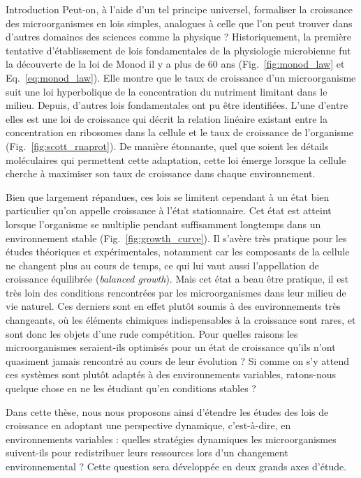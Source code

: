 \begin{chapter_summary}{Introduction}
Peut-on, à l'aide d'un tel principe universel, formaliser la croissance des microorganismes en lois simples, analogues à celle que l'on peut trouver dans d'autres domaines des sciences comme la physique ?
Historiquement, la première tentative d'établissement de lois fondamentales de la physiologie microbienne  fut la découverte de la loi de Monod il y a plus de 60 ans (Fig.~\ref{fig:monod_law} et Eq.~\ref{eq:monod_law}).
Elle montre que le taux de croissance d'un microorganisme suit une loi hyperbolique de la concentration du nutriment limitant dans le milieu.
Depuis, d'autres lois fondamentales ont pu être identifiées.
L'une d'entre elles est une loi de croissance qui décrit la relation linéaire existant entre la concentration en ribosomes dans la cellule et le taux de croissance de l'organisme (Fig.~\ref{fig:scott_rnaprot}).
De manière étonnante, quel que soient les détails moléculaires qui permettent cette adaptation, cette loi émerge lorsque la cellule cherche à maximiser son taux de croissance dans chaque environnement.

Bien que largement répandues, ces lois se limitent cependant à un état bien particulier qu'on appelle croissance à l'état stationnaire.
Cet état est atteint lorsque l'organisme se multiplie pendant suffisamment longtemps dans un environnement stable (Fig.~\ref{fig:growth_curve}).
Il s'avère très pratique pour les études théoriques et expérimentales, notamment car les composants de la cellule ne changent plus au cours de temps, ce qui lui vaut aussi l'appellation de croissance équilibrée (\textit{balanced growth}).
Mais cet état a beau être pratique, il est très loin des conditions rencontrées par les microorganismes dans leur milieu de vie naturel.
Ces derniers sont en effet plutôt soumis à des environnements très changeants, où les éléments chimiques indispensables à la croissance sont rares, et sont donc les objets d'une rude compétition.
Pour quelles raisons les microorganismes seraient-ils optimisés pour un état de croissance qu'ils n'ont quasiment jamais rencontré au cours de leur évolution ?
Si comme on s'y attend ces systèmes sont plutôt adaptés à des environnements variables, ratons-nous quelque chose en ne les étudiant qu'en conditions stables ?

Dans cette thèse, nous nous proposons ainsi d'étendre les études des lois de croissance en adoptant une perspective dynamique, c'est-à-dire, en environnements variables : quelles stratégies dynamiques les microorganismes suivent-ils pour redistribuer leurs ressources lors d'un changement environnemental ?
Cette question sera développée en deux grands axes d'étude.


\end{chapter_summary}
